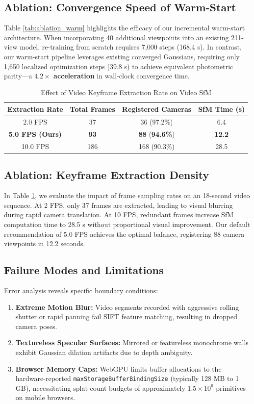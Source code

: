 \documentclass[conference]{IEEEtran}
\begin{document}
\subsection{Ablation: Convergence Speed of Warm-Start}
Table \ref{tab:ablation_warm} highlights the efficacy of our incremental warm-start architecture. When incorporating 40 additional viewpoints into an existing 211-view model, re-training from scratch requires 7,000 steps (168.4 s). In contrast, our warm-start pipeline leverages existing converged Gaussians, requiring only 1,650 localized optimization steps (39.8 s) to achieve equivalent photometric parity—a \textbf{$4.2\times$ acceleration} in wall-clock convergence time.

\begin{table}[htbp]
\caption{Effect of Video Keyframe Extraction Rate on Video SfM}
\centering
\begin{tabular}{cccc}
\toprule
\textbf{Extraction Rate} & \textbf{Total Frames} & \textbf{Registered Cameras} & \textbf{SfM Time (s)} \\
\midrule
2.0 FPS & 37  & 36  (97.2\%) & 6.4 \\
\textbf{5.0 FPS (Ours)} & \textbf{93}  & \textbf{88}  (\textbf{94.6\%}) & \textbf{12.2} \\
10.0 FPS & 186 & 168 (90.3\%) & 28.5 \\
\bottomrule
\end{tabular}
\label{tab:fps_ablation}
\end{table}

\subsection{Ablation: Keyframe Extraction Density}
In Table \ref{tab:fps_ablation}, we evaluate the impact of frame sampling rates on an 18-second video sequence. At 2 FPS, only 37 frames are extracted, leading to visual blurring during rapid camera translation. At 10 FPS, redundant frames increase SfM computation time to 28.5 s without proportional visual improvement. Our default recommendation of 5.0 FPS achieves the optimal balance, registering 88 camera viewpoints in 12.2 seconds.

\subsection{Failure Modes and Limitations}
Error analysis reveals specific boundary conditions:
\begin{enumerate}
    \item \textbf{Extreme Motion Blur:} Video segments recorded with aggressive rolling shutter or rapid panning fail SIFT feature matching, resulting in dropped camera poses.
    \item \textbf{Textureless Specular Surfaces:} Mirrored or featureless monochrome walls exhibit Gaussian dilation artifacts due to depth ambiguity.
    \item \textbf{Browser Memory Caps:} WebGPU limits buffer allocations to the hardware-reported \texttt{maxStorageBufferBindingSize} (typically 128 MB to 1 GB), necessitating splat count budgets of approximately $1.5 \times 10^6$ primitives on mobile browsers.
\end{enumerate}
\end{document}
